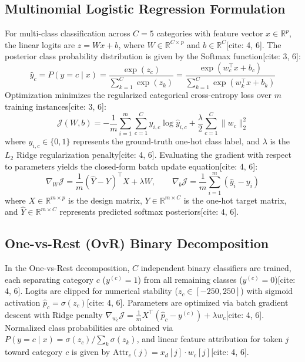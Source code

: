 \documentclass[11pt,a4paper]{article}
\begin{document}
	\subsection{Multinomial Logistic Regression Formulation}
	For multi-class classification across $C = 5$ categories with feature vector $x \in \mathbb{R}^p$, the linear logits are $z = W x + b$, where $W \in \mathbb{R}^{C \times p}$ and $b \in \mathbb{R}^C$[cite: 4, 6]. The posterior class probability distribution is given by the Softmax function[cite: 3, 6]:
	\begin{equation}
		\hat{y}_c = P(y = c \mid x) = \frac{\exp(z_c)}{\sum_{k=1}^{C} \exp(z_k)} = \frac{\exp(w_c^\top x + b_c)}{\sum_{k=1}^{C} \exp(w_k^\top x + b_k)}
		\label{eq:softmax_prob}
	\end{equation}
	Optimization minimizes the regularized categorical cross-entropy loss over $m$ training instances[cite: 3, 6]:
	\begin{equation}
		\mathcal{J}(W, b) = -\frac{1}{m} \sum_{i=1}^{m} \sum_{c=1}^{C} y_{i,c} \log \hat{y}_{i,c} + \frac{\lambda}{2} \sum_{c=1}^{C} \|w_c\|_2^2
		\label{eq:full_cross_entropy}
	\end{equation}
	where $y_{i,c} \in \{0, 1\}$ represents the ground-truth one-hot class label, and $\lambda$ is the $L_2$ Ridge regularization penalty[cite: 4, 6]. Evaluating the gradient with respect to parameters yields the closed-form batch update equation[cite: 4, 6]:
	\begin{equation}
		\nabla_W \mathcal{J} = \frac{1}{m} (\hat{Y} - Y)^\top X + \lambda W, \qquad \nabla_b \mathcal{J} = \frac{1}{m} \sum_{i=1}^{m} (\hat{y}_i - y_i)
		\label{eq:matrix_gradient}
	\end{equation}
	where $X \in \mathbb{R}^{m \times p}$ is the design matrix, $Y \in \mathbb{R}^{m \times C}$ is the one-hot target matrix, and $\hat{Y} \in \mathbb{R}^{m \times C}$ represents predicted softmax posteriors[cite: 4, 6].
	
	\subsection{One-vs-Rest (OvR) Binary Decomposition}
	In the One-vs-Rest decomposition, $C$ independent binary classifiers are trained, each separating category $c$ ($y^{(c)} = 1$) from all remaining classes ($y^{(c)} = 0$)[cite: 4, 6]. Logits are clipped for numerical stability ($z_c \in [-250, 250]$) with sigmoid activation $\hat{p}_c = \sigma(z_c)$[cite: 4, 6]. Parameters are optimized via batch gradient descent with Ridge penalty $\nabla_{w_c} \mathcal{J} = \frac{1}{m} X^\top (\hat{p}_c - y^{(c)}) + \lambda w_c$[cite: 4, 6]. Normalized class probabilities are obtained via $P(y = c \mid x) = \sigma(z_c) / \sum_k \sigma(z_k)$, and linear feature attribution for token $j$ toward category $c$ is given by $\text{Attr}_c(j) = x_d[j] \cdot w_c[j]$[cite: 4, 6].
	
\end{document}
